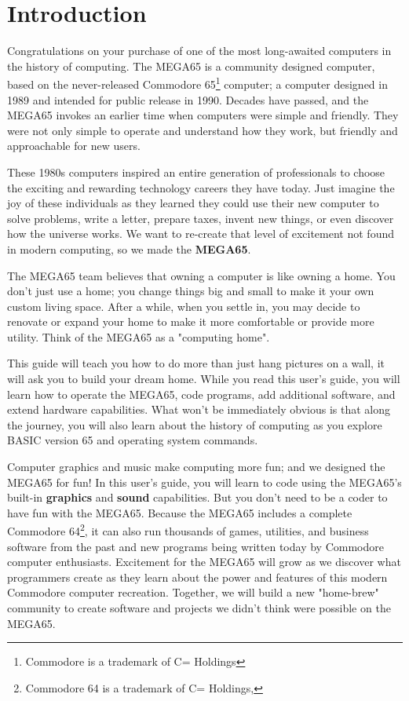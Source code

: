 \chapter{Introduction}

Congratulations on your purchase of one of the most long-awaited computers in the history of computing. The MEGA65 is a community designed computer, based on the never-released Commodore{\textregistered} 65\footnote{Commodore is a trademark of C= Holdings} computer; a computer designed in 1989 and intended for public release in 1990. Decades have passed, and the MEGA65 invokes an earlier time when computers were simple and friendly. They were not only simple to operate and understand how they work, but friendly and approachable for new users.

These 1980s computers inspired an entire generation of professionals to choose the exciting and rewarding technology careers they have today. Just imagine the joy of these individuals as they learned they could use their new computer to solve problems, write a letter, prepare taxes, invent new things, or even discover how the universe works. We want to re-create that level of excitement not found in modern computing, so we made the {\bf MEGA65}.

The MEGA65 team believes that owning a computer is like owning a home. You don't just use a home; you change things big and small to make it your own custom living space. After a while, when you settle in, you may decide to renovate or expand your home to make it more comfortable or provide more utility. Think of the MEGA65 as a "computing home".

This guide will teach you how to do more than just hang pictures on a wall, it will ask you to build your dream home. While you read this user's guide, you will learn how to operate the MEGA65, code programs, add additional software, and extend hardware capabilities. What won't be immediately obvious is that along the journey, you will also learn about the history of computing as you explore BASIC version 65 and operating system commands.

Computer graphics and music make computing more fun; and we designed the MEGA65 for fun! In this user's guide, you will learn to code using the MEGA65's built-in {\bf graphics} and {\bf sound} capabilities. But you don't need to be a coder to have fun with the MEGA65. Because the MEGA65 includes a complete Commodore{\textregistered} 64{\texttrademark}\footnote{Commodore 64 is a trademark of C= Holdings,}, it can also run thousands of games, utilities, and business software from the past and new programs being written today by Commodore computer enthusiasts. Excitement for the MEGA65 will grow as we discover what programmers create as they learn about the power and features of this modern Commodore computer recreation. Together, we will build a new "home-brew" community to create software and projects we didn't think were possible on the MEGA65.


